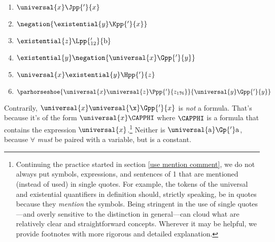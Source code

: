\begin{multicols}{2}
\begin{enumerate}
\item $\universal{\variable{x}}\Jpp{'}{\variable{x}}$ 
\item $\negation{\existential{\variable{y}}\Kpp{'}{\variable{x}}}$ 
\item $\existential{\variable{z}}\Lpp{'_{12}}{\constant{b}}$
\item $\existential{\variable{y}}\negation{\universal{\variable{x}}\Gpp{'}{\variable{y}}}$ 
\item $\universal{\variable{x}}\existential{\variable{y}}\Hpp{'}{\variable{z}}$ 
\item $\parhorseshoe{\universal{\variable{x}}\universal{\variable{z}}\Ppp{'}{\variable{z}_{176}}}{\universal{\variable{y}}\Gpp{'}{\variable{y}}}$ 
\end{enumerate}
\end{multicols}
\noindent{}Contrarily, $\universal{\variable{x}}\universal{\x}\Gpp{'}{\variable{x}}$ is \emph{not} a formula.  That's because it's of the form $\universal{\variable{x}}\CAPPHI$ where $\CAPPHI$ is a formula that contains the expression $\universal{\variable{x}}$.\footnote{Continuing the practice started in section \ref{use mention comment}, we do not always put symbols, expressions, and sentences of \GQL{}1 that are mentioned (instead of used) in single quotes. 
For example, the tokens of the universal and existential quantifiers in definition  should, strictly speaking, be in quotes because they \emph{mention} the symbols. 
Being stringent in the use of single quotes---and overly sensitive to the  distinction in general---can cloud what are relatively clear and straightforward concepts.
Wherever it may be helpful, we provide footnotes with more rigorous and detailed explanation.} Neither is $\universal{\constant{a}}\Gp{'}\constant{a}$, because $\forall$ \emph{must} be paired with a variable, but  is a constant.

